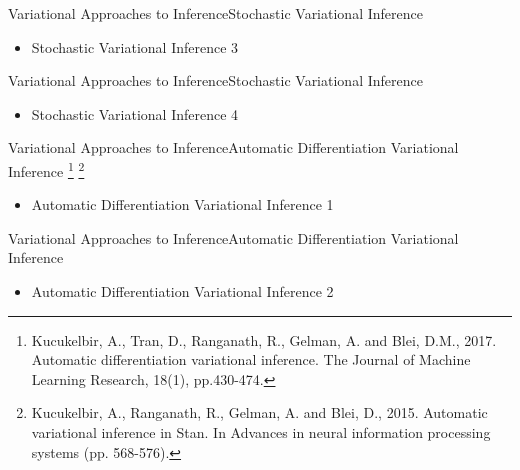\documentclass[AERbeamer%
              ,optEnglish%
              ,optBiber%
              ,optBibstyleAlphabetic%
              ,optBeamerClassicFormat%
              ]{AERlatex}%
\begin{document}
\begin{frame}[c]{Variational Approaches to Inference}{Stochastic Variational Inference}
    \centering
    \begin{itemize}
        \item Stochastic Variational Inference 3
    \end{itemize}
\end{frame}


\begin{frame}[c]{Variational Approaches to Inference}{Stochastic Variational Inference}
    \centering
    \begin{itemize}
        \item Stochastic Variational Inference 4
    \end{itemize}
\end{frame}



\begin{frame}[c]{Variational Approaches to Inference}{Automatic Differentiation Variational Inference \footnote{Kucukelbir, A., Tran, D., Ranganath, R., Gelman, A. and Blei, D.M., 2017.
                                                                                                                Automatic differentiation variational inference. The Journal of Machine
                                                                                                                Learning Research, 18(1), pp.430-474.}
                                                                                                      \footnote{Kucukelbir, A., Ranganath, R., Gelman, A. and Blei, D., 2015. Automatic
                                                                                                                variational inference in Stan. In Advances in neural information processing
                                                                                                                systems (pp. 568-576).}}
    \centering
    \begin{itemize}
        \item Automatic Differentiation Variational Inference 1
    \end{itemize}
\end{frame}


\begin{frame}[c]{Variational Approaches to Inference}{Automatic Differentiation Variational Inference}
    \centering
    \begin{itemize}
        \item Automatic Differentiation Variational Inference 2
    \end{itemize}
\end{frame}
\end{document}
